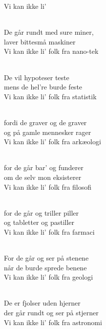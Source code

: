 \begin{song}{Vi kan ikke li'}
  \begin{SBVerse}
    \\
    De går rundt med sure miner,\\
    laver bittesmå maskiner\\
    Vi kan ikke li' folk fra nano-tek
  \end{SBVerse}

  \begin{SBVerse}
    \\
    De vil hypoteser teste\\
    mens de hel're burde feste\\
    Vi kan ikke li' folk fra statistik
  \end{SBVerse}

  \begin{SBVerse}
    \\
    fordi de graver og de graver\\
    og på gamle mennesker rager\\
    Vi kan ikke li' folk fra arkæologi
  \end{SBVerse}

  \begin{SBVerse}
    \\
    for de går bar' og funderer\\
    om de selv mon eksisterer\\
    Vi kan ikke li' folk fra filosofi
  \end{SBVerse}

  \begin{SBVerse}
    \\
    for de går og triller piller\\
    og tabletter og pastiller\\
    Vi kan ikke li' folk fra farmaci
  \end{SBVerse}

  \begin{SBVerse}
    \\
    For de går og ser på stenene\\
    når de burde sprede benene\\
    Vi kan ikke li' folk fra geologi
  \end{SBVerse}

  \begin{SBVerse}
    \\
    De er fjolser uden hjerner\\
    der går rundt og ser på stjerner\\
    Vi kan ikke li' folk fra astronomi
  \end{SBVerse}


\end{song}
